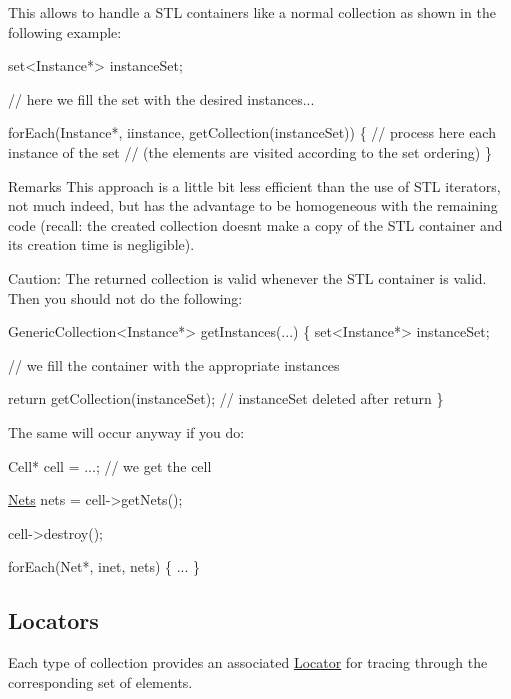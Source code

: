 This allows to handle a S\+TL containers like a normal collection as shown in the following example\+: 
\begin{DoxyCode}
set<Instance*> instanceSet;
 
\textcolor{comment}{// here we fill the set with the desired instances... }
 
forEach(Instance*, iinstance, getCollection(instanceSet)) \{
   \textcolor{comment}{// process here each instance of the set}
   \textcolor{comment}{// (the elements are visited according to the set ordering)}
\}
\end{DoxyCode}


\begin{DoxyRemark}{Remarks}
This approach is a little bit less efficient than the use of S\+TL iterators, not much indeed, but has the advantage to be homogeneous with the remaining code (recall\+: the created collection doesn\textquotesingle{}t make a copy of the S\+TL container and its creation time is negligible).
\end{DoxyRemark}
\begin{DoxyParagraph}{Caution\+: The returned collection is valid whenever the S\+TL container }
is valid. Then you should not do the following\+: 
\begin{DoxyCode}
GenericCollection<Instance*> getInstances(...)
\{
   set<Instance*> instanceSet;
 
   \textcolor{comment}{// we fill the container with the appropriate instances}
 
   \textcolor{keywordflow}{return} getCollection(instanceSet); \textcolor{comment}{// instanceSet deleted after return}
\}
\end{DoxyCode}

\end{DoxyParagraph}
The same will occur anyway if you do\+: 
\begin{DoxyCode}
Cell* cell = ...; \textcolor{comment}{// we get the cell}
 
\mbox{\hyperlink{namespaceHurricane_a3404a8b17130a1824f4a281704b04df7}{Nets}} nets = cell->getNets();
 
cell->destroy();
 
forEach(Net*, inet, nets) \{
   ...
\}
\end{DoxyCode}
\hypertarget{classHurricane_1_1Collection_secCollectionLocators}{}\subsection{Locators}\label{classHurricane_1_1Collection_secCollectionLocators}
Each type of collection provides an associated \mbox{\hyperlink{classHurricane_1_1Locator}{Locator}} for tracing through the corresponding set of elements.

